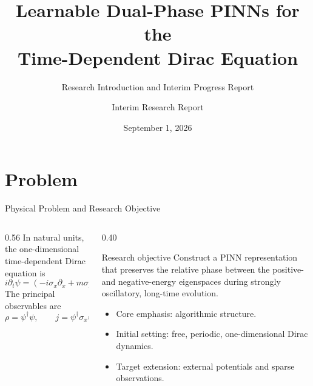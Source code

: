 \documentclass[aspectratio=169,10pt]{beamer}
\title[Dirac LTPB]{Learnable Dual-Phase PINNs for the\\
Time-Dependent Dirac Equation}
\subtitle{Research Introduction and Interim Progress Report}
\author[Interim Report]{Interim Research Report}
\date{September 1, 2026}
\begin{document}
\begin{frame}
  \titlepage
\end{frame}

\section{Problem}

\begin{frame}{Physical Problem and Research Objective}
\begin{columns}[T,onlytextwidth]
\begin{column}{0.56\textwidth}
In natural units, the one-dimensional time-dependent Dirac equation is
\begin{equation*}
i\partial_t\psi=
\left(-i\sigma_x\partial_x+m\sigma_z+V(x,t)I_2\right)\psi.
\end{equation*}
The principal observables are
\begin{equation*}
\rho=\psi^\dagger\psi,
\qquad
j=\psi^\dagger\sigma_x\psi,
\qquad
\partial_t\rho+\partial_xj=0.
\end{equation*}
\end{column}
\begin{column}{0.40\textwidth}
\begin{block}{Research objective}
Construct a PINN representation that preserves the relative phase between the
positive- and negative-energy eigenspaces during strongly oscillatory,
long-time evolution.
\end{block}
\begin{itemize}
  \item Core emphasis: algorithmic structure.
  \item Initial setting: free, periodic, one-dimensional Dirac dynamics.
  \item Target extension: external potentials and sparse observations.
\end{itemize}
\end{column}
\end{columns}
\end{frame}
\end{document}
